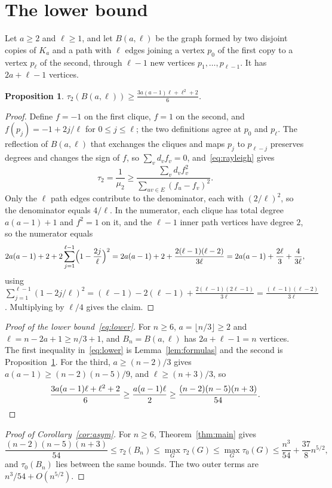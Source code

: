 \documentclass[11pt]{amsart}
\newtheorem{proposition}[theorem]{Proposition}
\theoremstyle{definition}
\theoremstyle{remark}
\numberwithin{equation}{section}
\begin{document}
\section{The lower bound}\label{sec:lower}

Let $a\ge2$ and $\ell\ge1$, and let $B(a,\ell)$ be the graph formed by two disjoint copies of $K_a$ and a path with $\ell$ edges joining a vertex $p_0$ of the first copy to a vertex $p_\ell$ of the second, through $\ell-1$ new vertices $p_1,\dots,p_{\ell-1}$. It has $2a+\ell-1$ vertices.

\begin{proposition}\label{prop:barbell}
$\displaystyle\tau_2(B(a,\ell))\ge\frac{3a(a-1)\ell+\ell^2+2}6$.
\end{proposition}

\begin{proof}
Define $f=-1$ on the first clique, $f=1$ on the second, and $f(p_j)=-1+2j/\ell$ for $0\le j\le\ell$; the two definitions agree at $p_0$ and $p_\ell$. The reflection of $B(a,\ell)$ that exchanges the cliques and maps $p_j$ to $p_{\ell-j}$ preserves degrees and changes the sign of $f$, so $\sum_vd_vf_v=0$, and~\eqref{eq:rayleigh} gives
\[
\tau_2=\frac1{\mu_2}\ge\frac{\sum_vd_vf_v^2}{\sum_{uv\in E}(f_u-f_v)^2}.
\]
Only the $\ell$ path edges contribute to the denominator, each with $(2/\ell)^2$, so the denominator equals $4/\ell$. In the numerator, each clique has total degree $a(a-1)+1$ and $f^2=1$ on it, and the $\ell-1$ inner path vertices have degree $2$, so the numerator equals
\[
2a(a-1)+2+2\sum_{j=1}^{\ell-1}\Bigl(1-\frac{2j}\ell\Bigr)^2=2a(a-1)+2+\frac{2(\ell-1)(\ell-2)}{3\ell}=2a(a-1)+\frac{2\ell}3+\frac4{3\ell},
\]
using $\sum_{j=1}^{\ell-1}(1-2j/\ell)^2=(\ell-1)-2(\ell-1)+\tfrac{2(\ell-1)(2\ell-1)}{3\ell}=\tfrac{(\ell-1)(\ell-2)}{3\ell}$. Multiplying by $\ell/4$ gives the claim.
\end{proof}

\begin{proof}[Proof of the lower bound~\eqref{eq:lower}]
For $n\ge6$, $a=\lfloor n/3\rfloor\ge2$ and $\ell=n-2a+1\ge n/3+1$, and $B_n=B(a,\ell)$ has $2a+\ell-1=n$ vertices. The first inequality in~\eqref{eq:lower} is Lemma~\ref{lem:formulas} and the second is Proposition~\ref{prop:barbell}. For the third, $a\ge(n-2)/3$ gives $a(a-1)\ge(n-2)(n-5)/9$, and $\ell\ge(n+3)/3$, so
\[
\frac{3a(a-1)\ell+\ell^2+2}6\ge\frac{a(a-1)\ell}2\ge\frac{(n-2)(n-5)(n+3)}{54}.\qedhere
\]
\end{proof}

\begin{proof}[Proof of Corollary~\ref{cor:asym}]
For $n\ge6$, Theorem~\ref{thm:main} gives
\[
\frac{(n-2)(n-5)(n+3)}{54}\le\tau_2(B_n)\le\max_G\tau_2(G)\le\max_G\tau_0(G)\le\frac{n^3}{54}+\frac{37}8n^{5/2},
\]
and $\tau_0(B_n)$ lies between the same bounds. The two outer terms are $n^3/54+O(n^{5/2})$.
\end{proof}
\end{document}
